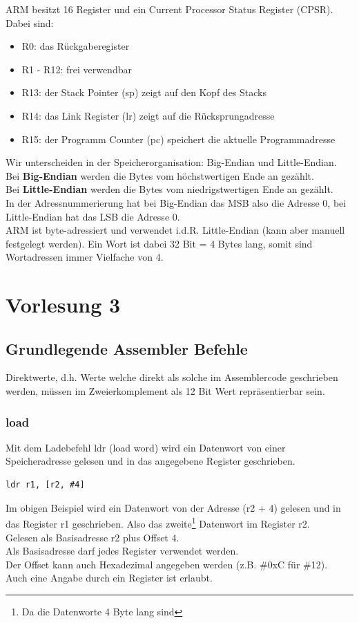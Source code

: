 \documentclass[a4paper,12pt,leqno]{article}
\begin{document}
ARM besitzt 16 Register und ein Current Processor Status Register (CPSR). Dabei sind:
\begin{itemize}
\item R0: das Rückgaberegister
\item R1 - R12: frei verwendbar
\item R13: der Stack Pointer (sp) zeigt auf den Kopf des Stacks
\item R14: das Link Register (lr) zeigt auf die Rücksprungadresse
\item R15: der Programm Counter (pc) speichert die aktuelle Programmadresse
\end{itemize}

Wir unterscheiden in der Speicherorganisation: Big-Endian und Little-Endian.\\
Bei \textbf{Big-Endian} werden die Bytes vom höchstwertigen Ende an gezählt.\\
Bei \textbf{Little-Endian} werden die Bytes vom niedrigstwertigen Ende an gezählt.\\
 
In der Adressnummerierung hat bei Big-Endian das MSB also die Adresse 0, bei Little-Endian hat das LSB die Adresse 0.\\
ARM ist byte-adressiert und verwendet i.d.R. Little-Endian (kann aber manuell festgelegt werden). Ein Wort ist dabei 32 Bit = 4 Bytes lang, somit sind Wortadressen immer Vielfache von 4.

\section{Vorlesung 3}
\subsection{Grundlegende Assembler Befehle}
Direktwerte, d.h. Werte welche direkt als solche im Assemblercode geschrieben werden, müssen im Zweierkomplement als 12 Bit Wert repräsentierbar sein.
\subsubsection{load}
Mit dem Ladebefehl ldr (load word) wird ein Datenwort von einer Speicheradresse gelesen und in das angegebene Register geschrieben. 
\begin{lstlisting}
ldr r1, [r2, #4]
\end{lstlisting}

Im obigen Beispiel wird ein Datenwort von der Adresse (r2 + 4) gelesen und in das Register r1 geschrieben. Also das zweite\footnote{Da die Datenworte 4 Byte lang sind} Datenwort im Register r2.\\
Gelesen als Basisadresse r2 plus Offset 4.\\
Als Basisadresse darf jedes Register verwendet werden.\\
Der Offset kann auch Hexadezimal angegeben werden (z.B. \#0xC für \#12).\\
Auch eine Angabe durch ein Register ist erlaubt.
\end{document}
